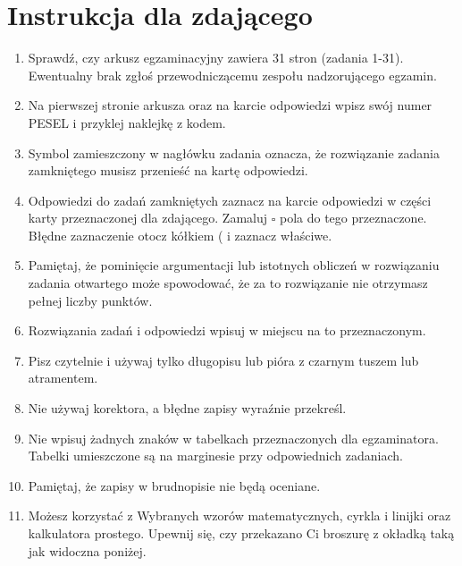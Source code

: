 \documentclass[10pt]{article}
\begin{document}
\section*{Instrukcja dla zdającego}
\begin{enumerate}
  \item Sprawdź, czy arkusz egzaminacyjny zawiera 31 stron (zadania 1-31). Ewentualny brak zgłoś przewodniczącemu zespołu nadzorującego egzamin.
  \item Na pierwszej stronie arkusza oraz na karcie odpowiedzi wpisz swój numer PESEL i przyklej naklejkę z kodem.
  \item Symbol zamieszczony w nagłówku zadania oznacza, że rozwiązanie zadania zamkniętego musisz przenieść na kartę odpowiedzi.
  \item Odpowiedzi do zadań zamkniętych zaznacz na karcie odpowiedzi w części karty przeznaczonej dla zdającego. Zamaluj \(\square\) pola do tego przeznaczone. Błędne zaznaczenie otocz kółkiem ( i zaznacz właściwe.
  \item Pamiętaj, że pominięcie argumentacji lub istotnych obliczeń w rozwiązaniu zadania otwartego może spowodować, że za to rozwiązanie nie otrzymasz pełnej liczby punktów.
  \item Rozwiązania zadań i odpowiedzi wpisuj w miejscu na to przeznaczonym.
  \item Pisz czytelnie i używaj tylko długopisu lub pióra z czarnym tuszem lub atramentem.
  \item Nie używaj korektora, a błędne zapisy wyraźnie przekreśl.
  \item Nie wpisuj żadnych znaków w tabelkach przeznaczonych dla egzaminatora. Tabelki umieszczone są na marginesie przy odpowiednich zadaniach.
  \item Pamiętaj, że zapisy w brudnopisie nie będą oceniane.
  \item Możesz korzystać z Wybranych wzorów matematycznych, cyrkla i linijki oraz kalkulatora prostego. Upewnij się, czy przekazano Ci broszurę z okładką taką jak widoczna poniżej.\\

\end{enumerate}
\end{document}
